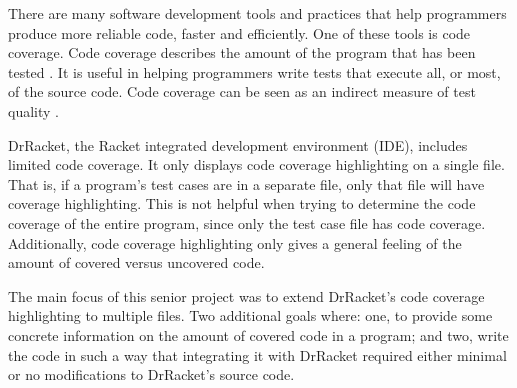 There are many software development tools and practices that help programmers produce more reliable code, faster and efficiently. One of these tools is code coverage. Code coverage describes the amount of the program that has been tested \cite{lasse}. It is useful in helping programmers write tests that execute all, or most, of the source code. Code coverage can be seen as an indirect measure of test quality \cite{lasse}.

DrRacket, the Racket integrated development environment (IDE), includes limited code coverage. It only displays code coverage highlighting on a single file. That is, if a program's test cases are in a separate file, only that file will have coverage highlighting. This is not helpful when trying to determine the code coverage of the entire program, since only the test case file has code coverage. Additionally, code coverage highlighting only gives a general feeling of the amount of covered versus uncovered code.

The main focus of this senior project was to extend DrRacket's code coverage highlighting to multiple files. Two additional goals where: one, to provide some concrete information on the amount of covered code in a program; and two, write the code in such a way that integrating it with DrRacket required either minimal or no modifications to DrRacket's source code.